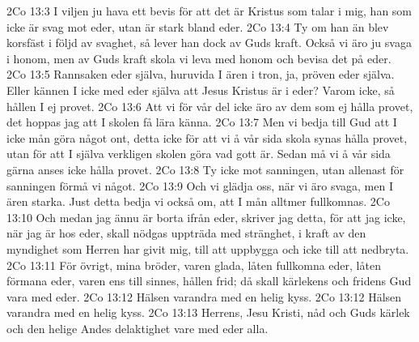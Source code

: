 2Co 13:3  I viljen ju hava ett bevis för att det är Kristus som talar i mig, han som icke är svag mot eder, utan är stark bland eder.
2Co 13:4  Ty om han än blev korsfäst i följd av svaghet, så lever han dock av Guds kraft. Också vi äro ju svaga i honom, men av Guds kraft skola vi leva med honom och bevisa det på eder.
2Co 13:5  Rannsaken eder själva, huruvida I ären i tron, ja, pröven eder själva. Eller kännen I icke med eder själva att Jesus Kristus är i eder? Varom icke, så hållen I ej provet.
2Co 13:6  Att vi för vår del icke äro av dem som ej hålla provet, det hoppas jag att I skolen få lära känna.
2Co 13:7  Men vi bedja till Gud att I icke mån göra något ont, detta icke för att vi å vår sida skola synas hålla provet, utan för att I själva verkligen skolen göra vad gott är. Sedan må vi å vår sida gärna anses icke hålla provet.
2Co 13:8  Ty icke mot sanningen, utan allenast för sanningen förmå vi något.
2Co 13:9  Och vi glädja oss, när vi äro svaga, men I ären starka. Just detta bedja vi också om, att I mån alltmer fullkomnas.
2Co 13:10  Och medan jag ännu är borta ifrån eder, skriver jag detta, för att jag icke, när jag är hos eder, skall nödgas uppträda med stränghet, i kraft av den myndighet som Herren har givit mig, till att uppbygga och icke till att nedbryta.
2Co 13:11  För övrigt, mina bröder, varen glada, låten fullkomna eder, låten förmana eder, varen ens till sinnes, hållen frid; då skall kärlekens och fridens Gud vara med eder.
2Co 13:12  Hälsen varandra med en helig kyss.
2Co 13:12  Hälsen varandra med en helig kyss.
2Co 13:13  Herrens, Jesu Kristi, nåd och Guds kärlek och den helige Andes delaktighet vare med eder alla.


